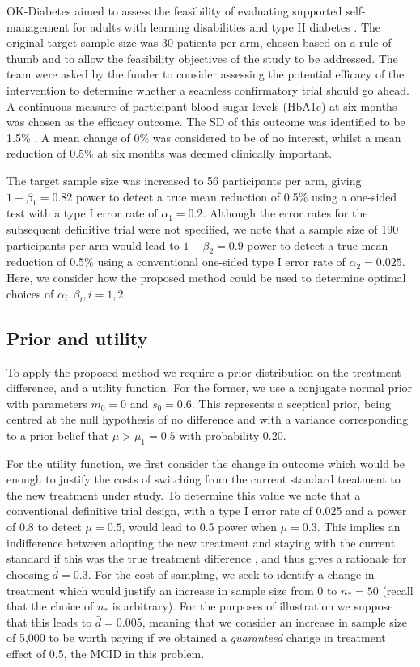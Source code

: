 \documentclass[sagev, Crown]{sagej} %
\begin{document}
OK-Diabetes aimed to assess the feasibility of evaluating supported self-management for adults with learning disabilities and type II diabetes \cite{Walwyn2015}. The original target sample size was 30 patients per arm, chosen based on a rule-of-thumb \cite{Lancaster2004} and to allow the feasibility objectives of the study to be addressed. The team were asked by the funder to consider assessing the potential efficacy of the intervention to determine whether a seamless confirmatory trial should go ahead. A continuous measure of participant blood sugar levels (HbA1c) at six months was chosen as the efficacy outcome. The SD of this outcome was identified to be 1.5\% \cite{OKD2013}. A mean change of 0\% was considered to be of no interest, whilst a mean reduction of 0.5\% at six months was deemed clinically important. 

The target sample size was increased to 56 participants per arm, giving $1-\beta_1 = 0.82$ power to detect a true mean reduction of 0.5\% using a one-sided test with a type I error rate of $\alpha_1 = 0.2$. Although the error rates for the subsequent definitive trial were not specified, we note that a sample size of 190 participants per arm would lead to $1-\beta_2 = 0.9$ power to detect a true mean reduction of 0.5\% using a conventional one-sided type I error rate of $\alpha_2 = 0.025$. Here, we consider how the proposed method could be used to determine optimal choices of $\alpha_i, \beta_i, i=1,2$.

\subsection{Prior and utility}

To apply the proposed method we require a prior distribution on the treatment difference, and a utility function. For the former, we use a conjugate normal prior with parameters $m_0 = 0$ and $s_0 = 0.6$. This represents a sceptical prior, being centred at the null hypothesis of no difference and with a variance corresponding to a prior belief that $\mu > \mu_1 = 0.5$ with probability 0.20.

For the utility function, we first consider the change in outcome which would be enough to justify the costs of switching from the current standard treatment to the new treatment under study. To determine this value we note that a conventional definitive trial design, with a type I error rate of 0.025 and a power of 0.8 to detect $\mu = 0.5$, would lead to 0.5 power when $\mu = 0.3$. This implies an indifference between adopting the new treatment and staying with the current standard if this was the true treatment difference \cite{Willan2005}, and thus gives a rationale for choosing $\hat{d} = 0.3$. For the cost of sampling, we seek to identify a change in treatment which would justify an increase in sample size from 0 to $n_* = 50$ (recall that the choice of $n_*$ is arbitrary). For the purposes of illustration we suppose that this leads to $\bar{d} = 0.005$, meaning that we consider an increase in sample size of 5,000 to be worth paying if we obtained a \emph{guaranteed} change in treatment effect of 0.5, the MCID in this problem.
\end{document}
